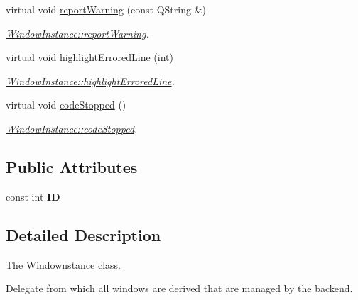 \begin{DoxyCompactItemize}
virtual void \hyperlink{classInstances_1_1WindowInstance_a92a296bb3476b0e8abe371d51b2e8dde}{report\+Warning} (const Q\+String \&)
\begin{DoxyCompactList}\small\item\em \hyperlink{classInstances_1_1WindowInstance_a92a296bb3476b0e8abe371d51b2e8dde}{Window\+Instance\+::report\+Warning}. \end{DoxyCompactList}\item 
virtual void \hyperlink{classInstances_1_1WindowInstance_a2fd33b23af086fddd16b6718d08f73d5}{highlight\+Errored\+Line} (int)
\begin{DoxyCompactList}\small\item\em \hyperlink{classInstances_1_1WindowInstance_a2fd33b23af086fddd16b6718d08f73d5}{Window\+Instance\+::highlight\+Errored\+Line}. \end{DoxyCompactList}\item 
virtual void \hyperlink{classInstances_1_1WindowInstance_a432a78ddfc8fdd62ae0d8e715bc57841}{code\+Stopped} ()
\begin{DoxyCompactList}\small\item\em \hyperlink{classInstances_1_1WindowInstance_a432a78ddfc8fdd62ae0d8e715bc57841}{Window\+Instance\+::code\+Stopped}. \end{DoxyCompactList}\end{DoxyCompactItemize}
\subsection*{Public Attributes}
\begin{DoxyCompactItemize}
\item 
\hypertarget{classInstances_1_1IInstance_a215b003cb2f0986801fa911533794b14}{const int {\bfseries I\+D}}\label{classInstances_1_1IInstance_a215b003cb2f0986801fa911533794b14}

\end{DoxyCompactItemize}


\subsection{Detailed Description}
The Windownstance class. 

Delegate from which all windows are derived that are managed by the backend. 


